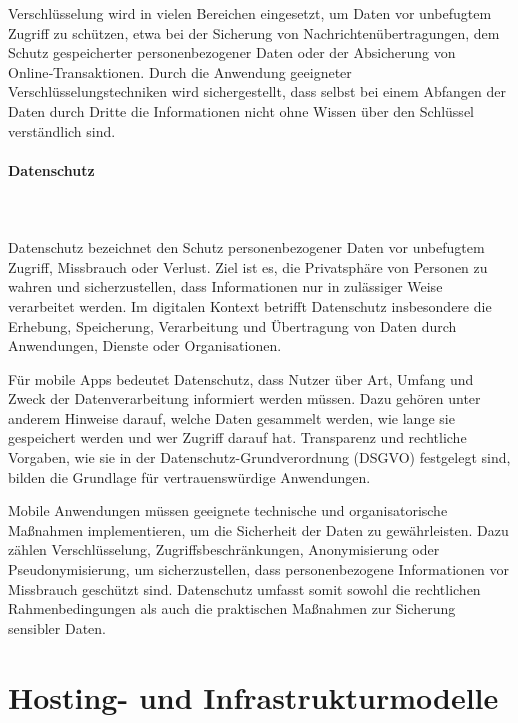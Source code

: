Verschlüsselung wird in vielen Bereichen eingesetzt, um Daten vor unbefugtem Zugriff zu schützen, etwa bei der Sicherung von Nachrichtenübertragungen, dem Schutz gespeicherter personenbezogener Daten oder der Absicherung von Online‑Transaktionen. Durch die Anwendung geeigneter Verschlüsselungstechniken wird sichergestellt, dass selbst bei einem Abfangen der Daten durch Dritte die Informationen nicht ohne Wissen über den Schlüssel verständlich sind.\cite{kaspersky_encryption}

\paragraph{Datenschutz}
\mbox{}\\
\mbox{}\\
Datenschutz bezeichnet den Schutz personenbezogener Daten vor unbefugtem Zugriff, Missbrauch oder Verlust. Ziel ist es, die Privatsphäre von Personen zu wahren und sicherzustellen, dass Informationen nur in zulässiger Weise verarbeitet werden. Im digitalen Kontext betrifft Datenschutz insbesondere die Erhebung, Speicherung, Verarbeitung und Übertragung von Daten durch Anwendungen, Dienste oder Organisationen.\cite{onlinesicherheit_mobile_apps_info}

Für mobile Apps bedeutet Datenschutz, dass Nutzer über Art, Umfang und Zweck der Datenverarbeitung informiert werden müssen. Dazu gehören unter anderem Hinweise darauf, welche Daten gesammelt werden, wie lange sie gespeichert werden und wer Zugriff darauf hat. Transparenz und rechtliche Vorgaben, wie sie in der Datenschutz-Grundverordnung (DSGVO) festgelegt sind, bilden die Grundlage für vertrauenswürdige Anwendungen.\cite{onlinesicherheit_mobile_apps_info}

Mobile Anwendungen müssen geeignete technische und organisatorische Maßnahmen implementieren, um die Sicherheit der Daten zu gewährleisten. Dazu zählen Verschlüsselung, Zugriffsbeschränkungen, Anonymisierung oder Pseudonymisierung, um sicherzustellen, dass personenbezogene Informationen vor Missbrauch geschützt sind. Datenschutz umfasst somit sowohl die rechtlichen Rahmenbedingungen als auch die praktischen Maßnahmen zur Sicherung sensibler Daten.\cite{onlinesicherheit_mobile_apps_info}


\section{Hosting- und Infrastrukturmodelle}

